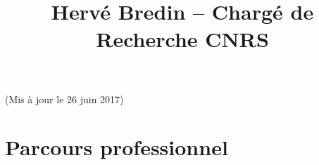 \documentclass{simplecv}
\begin{document}
\pagestyle{empty}



\title{Herv\'{e} Bredin -- Charg\'{e} de Recherche CNRS}

\maketitle

\vspace{-1.cm}
\begin{center}
(Mis \`{a} jour le 26 juin 2017)
\end{center}

\section{Parcours professionnel}
\end{document}
